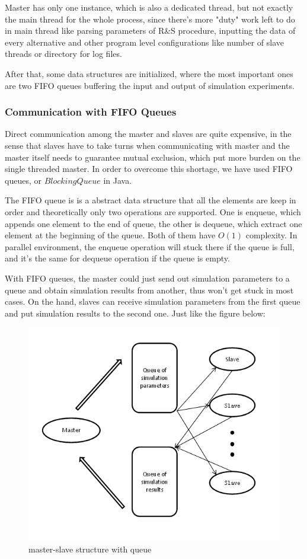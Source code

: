 Master has only one instance, which is also a dedicated thread, but not exactly the main thread for the whole process, since there's more "duty" work left to do in main thread like parsing parameters of R\&S procedure, inputting the data of every alternative and other program level configurations like number of slave threads or directory for log files.

After that, some data structures are initialized, where the most important ones are two FIFO queues buffering the input and output of simulation experiments.

\subsubsection{Communication with FIFO Queues}

Direct communication among the master and slaves are quite expensive, in the sense that slaves have to take turns when communicating with master and the master itself needs to guarantee mutual exclusion, which put more burden on the single threaded master. In order to overcome this shortage, we have used FIFO queues, or $BlockingQueue$ in Java.

The FIFO queue is is a abstract data structure that all the elements are keep in order and theoretically only two operations are supported. One is enqueue, which appends one element to the end of queue, the other is dequeue, which extract one element at the beginning of the queue. Both of them have $O(1)$ complexity. In parallel environment, the enqueue operation will stuck there if the queue is full, and it's the same for dequeue operation if the queue is empty.

With FIFO queues, the master could just send out simulation parameters to a queue and obtain simulation results from another, thus won't get stuck in most cases. On the hand, slaves can receive simulation parameters from the first queue and put simulation results to the second one. Just like the figure below:

\begin{figure}[ht]
\centering
\includegraphics[width=120mm]{master-slave-queue.png}
\caption{master-slave structure with queue}
\end{figure}

